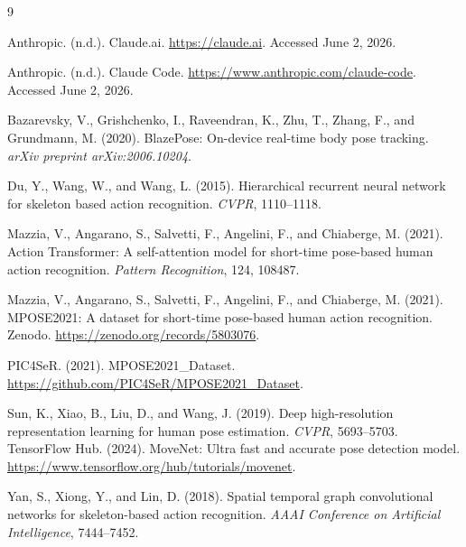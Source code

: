 \documentclass[final]{article}
\begin{document}
\newpage
\begin{thebibliography}{9}

Anthropic. (n.d.).
\newblock Claude.ai.
\newblock \url{https://claude.ai}. Accessed June 2, 2026.

Anthropic. (n.d.).
\newblock Claude Code.
\newblock \url{https://www.anthropic.com/claude-code}. Accessed June 2, 2026.

Bazarevsky, V., Grishchenko, I., Raveendran, K., Zhu, T., Zhang, F., and Grundmann, M. (2020).
\newblock BlazePose: On-device real-time body pose tracking.
\newblock \textit{arXiv preprint arXiv:2006.10204}.

Du, Y., Wang, W., and Wang, L. (2015).
\newblock Hierarchical recurrent neural network for skeleton based action recognition.
\newblock \textit{CVPR}, 1110--1118.

Mazzia, V., Angarano, S., Salvetti, F., Angelini, F., and Chiaberge, M. (2021).
\newblock Action Transformer: A self-attention model for short-time pose-based human action recognition.
\newblock \textit{Pattern Recognition}, 124, 108487.

Mazzia, V., Angarano, S., Salvetti, F., Angelini, F., and Chiaberge, M. (2021).
\newblock MPOSE2021: A dataset for short-time pose-based human action recognition.
\newblock Zenodo. \url{https://zenodo.org/records/5803076}.

PIC4SeR. (2021).
\newblock MPOSE2021\_Dataset.
\newblock \url{https://github.com/PIC4SeR/MPOSE2021_Dataset}.

Sun, K., Xiao, B., Liu, D., and Wang, J. (2019).
\newblock Deep high-resolution representation learning for human pose estimation.
\newblock \textit{CVPR}, 5693--5703.
TensorFlow Hub. (2024).
\newblock MoveNet: Ultra fast and accurate pose detection model.
\newblock \url{https://www.tensorflow.org/hub/tutorials/movenet}.

Yan, S., Xiong, Y., and Lin, D. (2018).
\newblock Spatial temporal graph convolutional networks for skeleton-based action recognition.
\newblock \textit{AAAI Conference on Artificial Intelligence}, 7444--7452.

\end{thebibliography}
\end{document}
